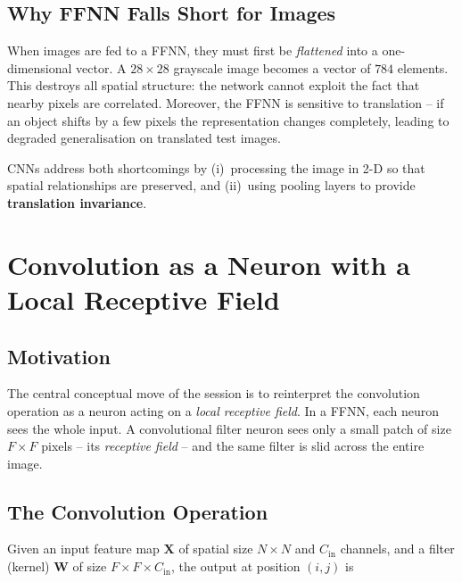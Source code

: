 \documentclass[12pt,a4paper]{article}
\begin{document}
\subsection{Why FFNN Falls Short for Images}
\label{subsec:ffnn_limit}

When images are fed to a FFNN, they must first be \emph{flattened} into a
one-dimensional vector.  A $28\times28$ grayscale image becomes a vector of
$784$ elements.  This destroys all spatial structure: the network cannot
exploit the fact that nearby pixels are correlated.  Moreover, the FFNN is
sensitive to translation -- if an object shifts by a few pixels the
representation changes completely, leading to degraded generalisation on
translated test images.

\begin{keyinsight}
CNNs address both shortcomings by (i)~processing the image in 2-D so that
spatial relationships are preserved, and (ii)~using pooling layers to provide
\textbf{translation invariance}.
\end{keyinsight}

\section{Convolution as a Neuron with a Local Receptive Field}
\label{sec:conv_neuron}

\subsection{Motivation}
\label{subsec:conv_motivation}

The central conceptual move of the session is to reinterpret the convolution
operation as a neuron acting on a \emph{local receptive field}.  In a FFNN,
each neuron sees the whole input.  A convolutional filter neuron sees only a
small patch of size $F\times F$ pixels -- its \emph{receptive field} -- and
the same filter is slid across the entire image.

\subsection{The Convolution Operation}
\label{subsec:conv_op}

Given an input feature map $\mathbf{X}$ of spatial size $N\times N$ and
$C_{\text{in}}$ channels, and a filter (kernel) $\mathbf{W}$ of size
$F\times F\times C_{\text{in}}$, the output at position $(i,j)$ is
\end{document}
